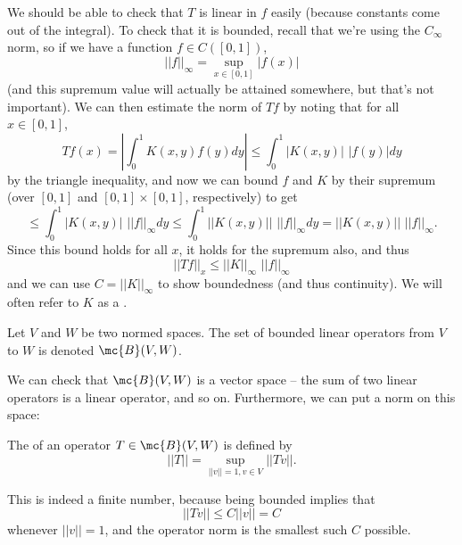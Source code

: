 We should be able to check that $T$ is linear in $f$ easily (because constants come out of the integral). To check that it is bounded, recall that we're using the $C_{\infty}$ norm, so if we have a function $f \in C([0, 1])$, \[
    ||f||_{\infty} = \sup_{x \in [0, 1]} |f(x)|
\]
(and this supremum value will actually be attained somewhere, but that's not important). We can then estimate the norm of $Tf$ by noting that for all $x \in [0, 1]$,
\[
    Tf(x) = \left|\int_0^1 K(x, y) f(y) dy\right| \le \int_0^1 |K(x, y)| \, \, |f(y)| dy
\]
by the triangle inequality, and now we can bound $f$ and $K$ by their supremum (over $[0, 1]$ and $[0, 1] \times [0, 1]$, respectively) to get 
\[
    \le \int_0^1 |K(x, y)| \, \, ||f||_{\infty} dy \le \int_0^1 ||K(x, y)|| \, \, ||f||_{\infty} dy = ||K(x, y)|| \, \,  ||f||_{\infty}.
\]
Since this bound holds for all $x$, it holds for the supremum also, and thus
\[
    ||Tf||_x \le ||K||_{\infty} \, \, ||f||_{\infty}
\]
and we can use $C = ||K||_{\infty}$ to show boundedness (and thus continuity). We will often refer to $K$ as a .

\begin{definition}
Let $V$ and $W$ be two normed spaces. The set of bounded linear operators from $V$ to $W$ is denoted $\mc{B}(V, W)$.
\end{definition}

We can check that $\mc{B}(V, W)$ is a vector space -- the sum of two linear operators is a linear operator, and so on. Furthermore, we can put a norm on this space: 

\begin{definition}
The  of an operator $T \in \mc{B}(V, W)$ is defined by
\[
    ||T|| = \sup_{||v|| = 1, v \in V} ||Tv||.
\]
\end{definition}

This is indeed a finite number, because being bounded implies that
\[
    ||Tv|| \le C||v|| = C
\]  
whenever $||v|| = 1$, and the operator norm is the smallest such $C$ possible.

